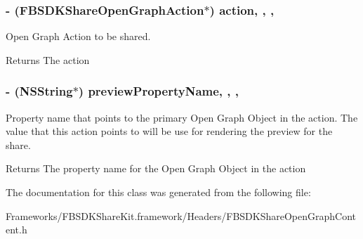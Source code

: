\subsubsection[{action}]{\setlength{\rightskip}{0pt plus 5cm}-\/ ({\bf F\+B\+S\+D\+K\+Share\+Open\+Graph\+Action}$\ast$) action\hspace{0.3cm}{\ttfamily [read]}, {\ttfamily [write]}, {\ttfamily [nonatomic]}, {\ttfamily [copy]}}\label{interface_f_b_s_d_k_share_open_graph_content_ad9e4ab55026e417b3c04f7b73d53f392}
Open Graph Action to be shared. \begin{DoxyReturn}{Returns}
The action 
\end{DoxyReturn}
\hypertarget{interface_f_b_s_d_k_share_open_graph_content_a138537cb75dbeab1a52aaf27b3bb60e8}{}
\subsubsection[{preview\+Property\+Name}]{\setlength{\rightskip}{0pt plus 5cm}-\/ (N\+S\+String$\ast$) preview\+Property\+Name\hspace{0.3cm}{\ttfamily [read]}, {\ttfamily [write]}, {\ttfamily [nonatomic]}, {\ttfamily [copy]}}\label{interface_f_b_s_d_k_share_open_graph_content_a138537cb75dbeab1a52aaf27b3bb60e8}
Property name that points to the primary Open Graph Object in the action.  The value that this action points to will be use for rendering the preview for the share. \begin{DoxyReturn}{Returns}
The property name for the Open Graph Object in the action 
\end{DoxyReturn}


The documentation for this class was generated from the following file\+:\begin{DoxyCompactItemize}
\item 
Frameworks/\+F\+B\+S\+D\+K\+Share\+Kit.\+framework/\+Headers/F\+B\+S\+D\+K\+Share\+Open\+Graph\+Content.\+h\end{DoxyCompactItemize}
